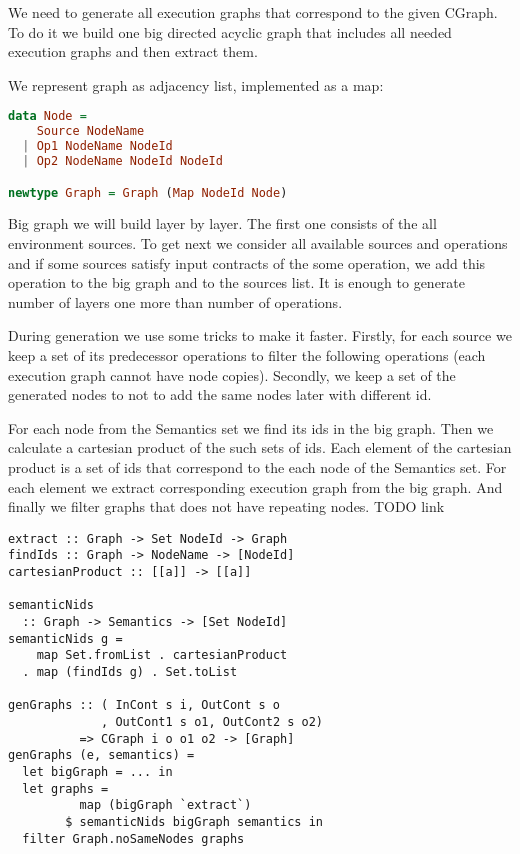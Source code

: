 We need to generate all execution graphs that correspond to the given CGraph.
To do it we build one big directed acyclic graph that includes all needed execution graphs and then extract them.

We represent graph as adjacency list, implemented as a map:

\begin{lstlisting}[language=Haskell]
data Node =
    Source NodeName
  | Op1 NodeName NodeId
  | Op2 NodeName NodeId NodeId

newtype Graph = Graph (Map NodeId Node)
\end{lstlisting}

Big graph we will build layer by layer.
The first one consists of the all environment sources.
To get next we consider all available sources and operations and if some sources satisfy input contracts of the some operation, we add this operation to the big graph and to the sources list.
It is enough to generate number of layers one more than number of operations.

During generation we use some tricks to make it faster.
Firstly, for each source we keep a set of its predecessor operations to filter the following operations (each execution graph cannot have node copies).
Secondly, we keep a set of the generated nodes to not to add the same nodes later with different id.

For each node from the Semantics set we find its ids in the big graph.
Then we calculate a cartesian product of the such sets of ids.
Each element of the cartesian product is a set of ids that correspond to the each node of the Semantics set.
For each element we extract corresponding execution graph from the big graph.
And finally we filter graphs that does not have repeating nodes.
TODO link 

\begin{lstlisting}[languages=Haskell]
extract :: Graph -> Set NodeId -> Graph
findIds :: Graph -> NodeName -> [NodeId]
cartesianProduct :: [[a]] -> [[a]]

semanticNids 
  :: Graph -> Semantics -> [Set NodeId]
semanticNids g = 
    map Set.fromList . cartesianProduct 
  . map (findIds g) . Set.toList

genGraphs :: ( InCont s i, OutCont s o
             , OutCont1 s o1, OutCont2 s o2) 
          => CGraph i o o1 o2 -> [Graph]
genGraphs (e, semantics) = 
  let bigGraph = ... in
  let graphs = 
          map (bigGraph `extract`) 
        $ semanticNids bigGraph semantics in
  filter Graph.noSameNodes graphs
\end{lstlisting}
